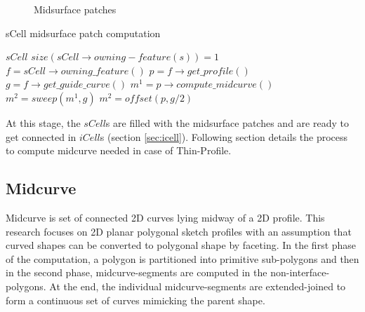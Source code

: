 	
	\begin{figure}[!h]
	\centering     %
	 \quad
	\caption{Midsurface patches } %
	\label{fig_scells}
	\end{figure}
			
	\begin{algorithm}[!h]
		\caption{sCell midsurface patch computation}
		\label{alg_MidsurfsCell}
		\begin{algorithmic}
			\REQUIRE $sCell$
			\ENSURE $size(sCell \rightarrow owning-feature(s)) = 1$
			\STATE $f = sCell \rightarrow owning\_feature()$
			\STATE $p = f \rightarrow get\_profile()$
			\STATE $g = f \rightarrow get\_guide\_curve()$
				\STATE $m^1 = p\rightarrow compute\_midcurve()$
				\STATE $m^2 = sweep(m^1 ,g)$
			\ELSE
				\STATE $m^2 = offset(p ,g/2)$
			\ENDIF
		\end{algorithmic}
	\end{algorithm}
	
	

At this stage, the $sCell$s are filled with the midsurface patches and are ready to get connected in $iCell$s (section \ref{sec:icell}). Following section details the process to compute midcurve needed in case of Thin-Profile.

\subsection{Midcurve} \label{sec:midcurve}
Midcurve is set of connected 2D curves lying midway of a 2D profile. This research focuses on 2D planar polygonal sketch profiles with an assumption that curved shapes can be converted to polygonal shape by faceting. In the first  phase of the computation, a  polygon is partitioned into primitive sub-polygons and then in the second phase, midcurve-segments are computed in the non-interface-polygons.  At the end, the individual midcurve-segments  are extended-joined to form a continuous set of curves mimicking the parent shape. 

